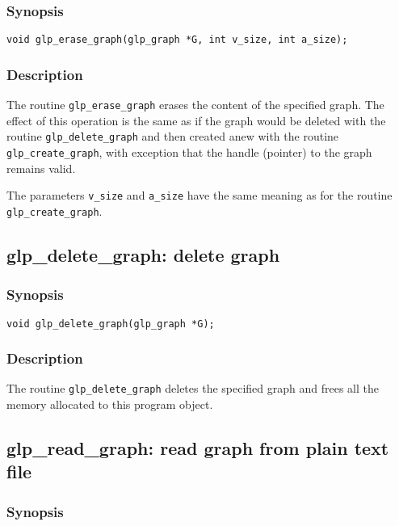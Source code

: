\subsubsection*{Synopsis}

\begin{verbatim}
void glp_erase_graph(glp_graph *G, int v_size, int a_size);
\end{verbatim}

\subsubsection*{Description}

The routine \verb|glp_erase_graph| erases the content of the specified
graph. The effect of this operation is the same as if the graph would be
deleted with the routine \verb|glp_delete_graph| and then created anew
with the routine \verb|glp_create_graph|, with exception that the handle
(pointer) to the graph remains valid.

The parameters \verb|v_size| and \verb|a_size| have the same meaning as
for the routine \verb|glp_create_graph|.

\subsection{glp\_delete\_graph: delete graph}

\subsubsection*{Synopsis}

\begin{verbatim}
void glp_delete_graph(glp_graph *G);
\end{verbatim}

\subsubsection*{Description}

The routine \verb|glp_delete_graph| deletes the specified graph and
frees all the memory allocated to this program object.

\newpage

\subsection{glp\_read\_graph: read graph from plain text file}

\subsubsection*{Synopsis}


